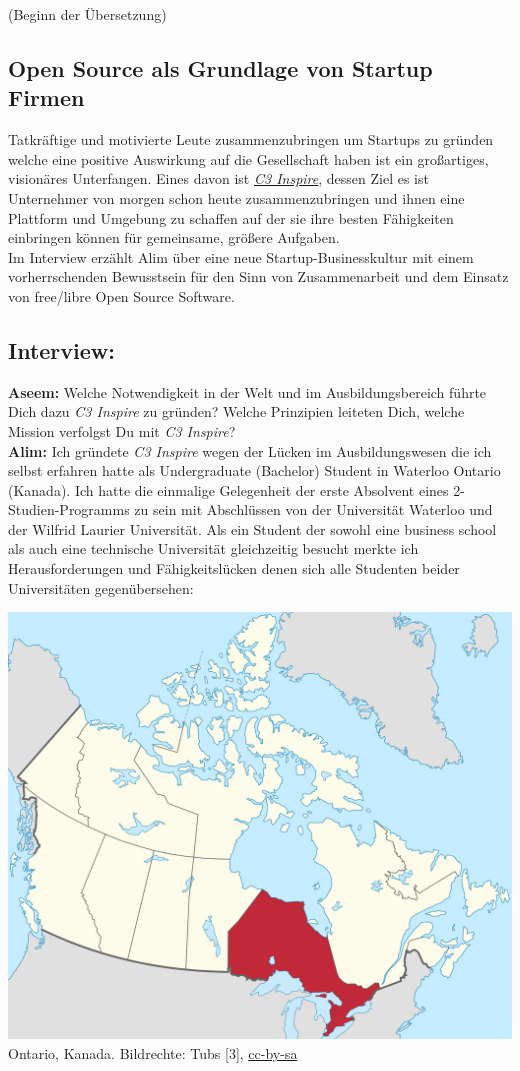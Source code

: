 (Beginn der Übersetzung)\\

\subsection*{Open Source als Grundlage von Startup Firmen}
Tatkräftige und motivierte Leute zusammenzubringen um Startups zu 
gründen welche eine positive Auswirkung auf die Gesellschaft haben ist 
ein großartiges, visionäres Unterfangen. Eines davon ist 
\href{http://c3inspire.com/about/}{\textit{C3 Inspire}}, 
dessen Ziel es ist Unternehmer von morgen schon heute 
zusammenzubringen und ihnen eine Plattform und Umgebung zu schaffen auf 
der sie ihre besten Fähigkeiten einbringen können für gemeinsame, 
größere Aufgaben. \\

Im Interview erzählt Alim über eine neue Startup-Businesskultur mit 
einem vorherrschenden Bewusstsein für den Sinn von Zusammenarbeit und 
dem Einsatz von free/libre Open Source Software.


\subsection*{Interview:} 
\textbf{Aseem:} Welche Notwendigkeit in der Welt und im Ausbildungsbereich 
führte Dich dazu \textit{C3 Inspire} zu gründen? Welche Prinzipien leiteten 
Dich, welche Mission verfolgst Du mit \textit{C3 Inspire}? 
\\ \textbf{Alim:} Ich gründete \textit{C3 Inspire} wegen der Lücken im Ausbildungswesen die ich 
selbst erfahren hatte als Undergraduate (Bachelor) Student in Waterloo 
Ontario (Kanada).  Ich hatte die einmalige Gelegenheit der erste 
Absolvent eines 2-Studien-Programms zu sein mit Abschlüssen von der 
Universität Waterloo und der Wilfrid Laurier Universität. Als ein 
Student der sowohl eine business school als auch eine technische 
Universität gleichzeitig besucht merkte ich Herausforderungen und 
Fähigkeitslücken denen sich alle Studenten beider Universitäten 
gegenübersehen: 

\begin{center}
\includegraphics[width=0.7\linewidth]{c3inspire/c3inspire-ontario.png} \\
\footnotesize{Ontario, Kanada. Bildrechte: Tubs [3], \href{https://creativecommons.org/licenses/by-sa/2.5/deed.de}{cc-by-sa}}
\end{center}

